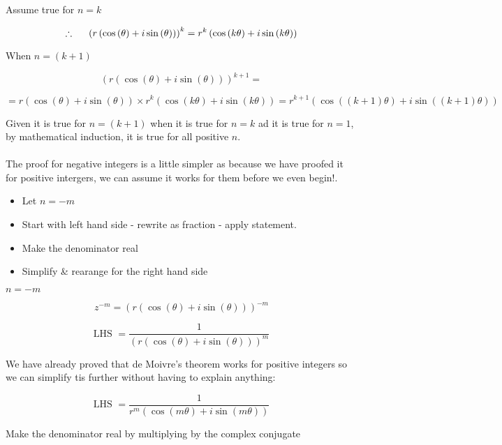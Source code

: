 \documentclass{article}
\begin{document}
\noindent Assume true for \(n=k\)

\[\therefore \hspace{0.2in} \left(r\left(\cos\left(\theta\right)+i\sin\left(\theta\right)\right)\right)^k=r^k\left(\cos\left(k\theta\right)+i\sin\left(k\theta\right)\right)\]

\noindent When \(n=\left(k+1\right)\)

\[\left(r\left(\cos\left(\theta\right)+i\sin\left(\theta\right)\right)\right)^{k+1}=\]

\[=r\left(\cos\left(\theta\right)+i\sin\left(\theta\right)\right)\times r^k\left(\cos\left(k\theta\right)+i\sin\left(k\theta\right)\right) = r^{k+1}\left(\cos\left(\left(k+1\right)\theta\right)+i\sin\left(\left(k+1\right)\theta\right)\right)\]

\noindent Given it is true for \(n=\left(k+1\right)\) when it is true for \(n=k\) ad it is true for \(n=1\), by mathematical induction, it is true for all positive \(n\). \\\\

\noindent The proof for negative integers is a little simpler as because we have proofed it for positive intergers, we can assume it works for them before we even begin!.

\begin{itemize}
\item Let \(n=-m\)
\item Start with left hand side - rewrite as fraction - apply statement.
\item Make the denominator real
\item Simplify \& rearange for the right hand side
\end{itemize}

\noindent \(n=-m\)

\[z^{-m}=\left(r\left(\cos\left(\theta\right)+i\sin\left(\theta\right)\right)\right)^{-m}\]

\[\text{LHS  }=\frac{1}{\left(r\left(\cos\left(\theta\right)+i\sin\left(\theta\right)\right)\right)^m}\]

\noindent We have already proved that de Moivre's theorem works for positive integers so we can simplify tis further without having to explain anything:

\[\text{LHS  }=\frac{1}{r^m\left(\cos\left(m\theta\right)+i\sin\left(m\theta\right)\right)}\]

\noindent Make the denominator real by multiplying by the complex conjugate
\end{document}
